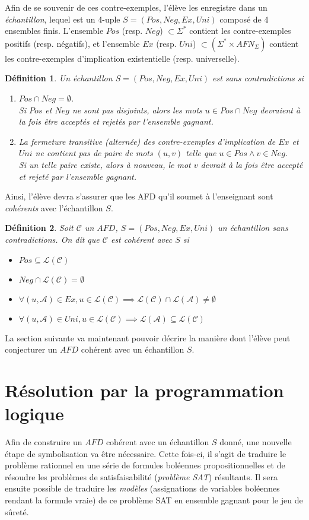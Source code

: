 \documentclass[12pt,a4paper,oneside,titlepage]{report}
\newtheorem{defi}{D\'efinition}[section]
\begin{document}
Afin de se souvenir de ces contre-exemples, l'élève les enregistre dans un \emph{échantillon}, lequel est un 4-uple $S=(Pos, Neg, Ex, Uni)$ composé de 4 ensembles finis. L'ensemble $Pos$ (resp. $Neg$) $\subset\Sigma^*$ contient les contre-exemples positifs (resp. négatifs), et l'ensemble $Ex$ (resp. $Uni$) $\subset(\Sigma^*\times AFN_\Sigma)$ contient les contre-exemples d'implication existentielle (resp. universelle).
\begin{defi}
Un échantillon $S=(Pos, Neg, Ex, Uni)$ est \emph{sans contradictions} si \begin{enumerate}
\item $Pos\cap Neg=\emptyset$.\\ 
Si $Pos$ et $Neg$ ne sont pas disjoints, alors les mots $u\in Pos\cap Neg$ devraient à la fois être acceptés et rejetés par l'ensemble gagnant.
\item La fermeture transitive (alternée) des contre-exemples d'implication de $Ex$ et $Uni$ ne contient pas de paire de mots $(u,v)$ telle que $u\in Pos \land v\in Neg$.\\
Si un telle paire existe, alors à nouveau, le mot $v$ devrait à la fois être accepté et rejeté par l'ensemble gagnant.

\end{enumerate}
\end{defi}
\noindent Ainsi, l'élève devra s'assurer que les AFD qu'il soumet à l'enseignant sont \emph{cohérents} avec l'échantillon $S$.
\begin{defi}
\label{consistency}
Soit $\mathcal{C}$ un $AFD$, $S=(Pos, Neg, Ex, Uni)$ un échantillon sans contradictions. On dit que $\mathcal{C}$ est \emph{cohérent} avec $S$ si
\begin{itemize}
\item $Pos\subseteq \mathcal{L}(\mathcal{C})$
\item $Neg\cap \mathcal{L}(\mathcal{C})=\emptyset$
\item $\forall (u,\mathcal{A})\in Ex, u\in\mathcal{L}(\mathcal{C})\implies  \mathcal{L}(\mathcal{C})\cap \mathcal{L}(\mathcal{A})\neq\emptyset$
\item $\forall (u,\mathcal{A})\in Uni, u\in\mathcal{L}(\mathcal{C})\implies  \mathcal{L}(\mathcal{A})\subseteq \mathcal{L}(\mathcal{C})$
\end{itemize}
\end{defi}
\noindent La section suivante va maintenant pouvoir décrire la manière dont l'élève peut conjecturer un $AFD$ cohérent avec un échantillon $S$.
\section{Résolution par la programmation logique}\label{prolog}
Afin de construire un $AFD$ cohérent avec un échantillon $S$ donné, une nouvelle étape de symbolisation va être nécessaire. Cette fois-ci, il s'agit de traduire le problème rationnel en une série de formules boléennes propositionnelles et de résoudre les problèmes de satisfaisabilité (\emph{problème SAT}) résultants. Il sera ensuite possible de traduire les \emph{modèles} (assignations de variables boléennes rendant la formule vraie) de ce problème SAT en ensemble gagnant pour le jeu de sûreté.
\end{document}
